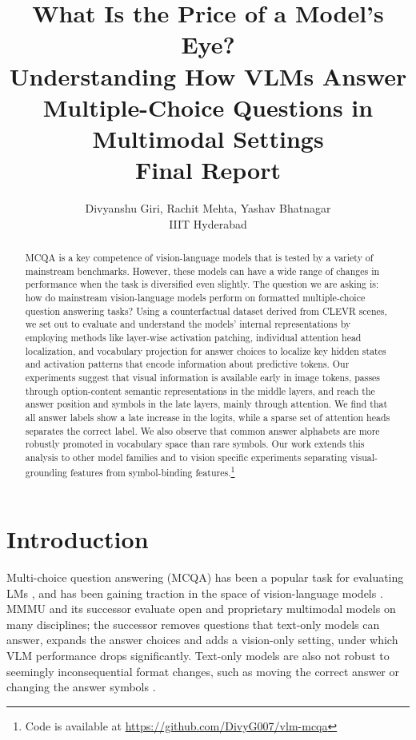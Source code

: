 \documentclass[11pt]{article}
\title{What Is the Price of a Model's Eye?\\
Understanding How VLMs Answer Multiple-Choice Questions in Multimodal Settings\\
Final Report}
\author{Divyanshu Giri, Rachit Mehta, Yashav Bhatnagar \\
        IIIT Hyderabad}
\begin{document}
\maketitle

\begin{abstract}
MCQA is a key competence of vision-language
models that is tested by a variety of mainstream
benchmarks. However, these models can have
a wide range of changes in performance when
the task is diversified even slightly. The question we are asking is: how do mainstream
vision-language models perform on formatted multiple-choice question answering tasks?
Using a counterfactual dataset derived from
CLEVR scenes, we set out to evaluate and understand the models’ internal representations
by employing methods like layer-wise activation patching, individual attention head localization, and vocabulary projection for answer
choices to localize key hidden states and activation patterns that encode information about
predictive tokens. Our experiments suggest that visual information is available early in
image tokens, passes through option-content semantic representations in the middle layers, and
reach the answer position and symbols in the
late layers, mainly through attention. We find
that all answer labels show a late increase in the
logits, while a sparse set of attention heads separates the correct label. We also observe that
common answer alphabets are more robustly
promoted in vocabulary space than rare symbols. Our work  extends this analysis to other model families and to vision specific experiments separating visual-grounding
features from symbol-binding features.\footnote{Code is available at \url{https://github.com/DivyG007/vlm-mcqa}}
\end{abstract}

\section{Introduction}

Multi-choice question answering (MCQA) has been a popular task for evaluating LMs \cite{wiegreffe2025answerassembleaceunderstanding}, and has been gaining traction in the space of vision-language models \cite{meng2024mmiumultimodalmultiimageunderstanding}. MMMU \cite{yue2024mmmu} and its successor \cite{yue2025mmmuprorobustmultidisciplinemultimodal} evaluate open and proprietary multimodal models on many disciplines; the successor removes questions that text-only models can answer, expands the answer choices and adds a vision-only setting, under which VLM performance drops significantly. Text-only models are also not robust to seemingly inconsequential format changes, such as moving the correct answer or changing the answer symbols \cite{pezeshkpour2024large,alzahrani2024when,khatun2024study,zheng2024large}.
\end{document}
